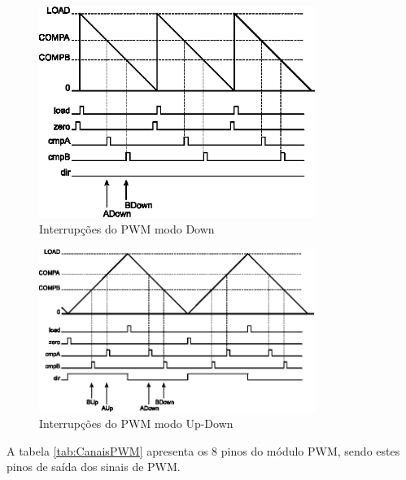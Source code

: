 \begin{figure}[H]
	\centering
	\includegraphics[width=0.8\textwidth] {figuras/PWMCountDownMode.eps}
	\caption{Interrupções do PWM modo Down \cite{DATASHEET_TIVA}}
	\label{fig:PWMCountDownMode}
\end{figure}

\begin{figure}[H]
	\centering
	\includegraphics[width=0.8\textwidth] {figuras/PWMCountUpDownMode.eps}
	\caption{Interrupções do PWM modo Up-Down \cite{DATASHEET_TIVA}}
	\label{fig:PWMCountUpDownMode}
\end{figure}

A tabela \ref{tab:CanaisPWM} apresenta os 8 pinos do módulo PWM, sendo estes pinos de saída dos sinais de PWM.

